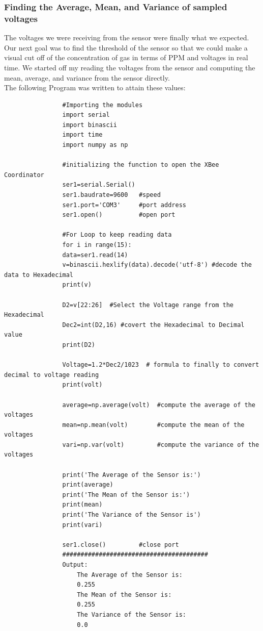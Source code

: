 		\subsubsection{Finding the Average, Mean, and Variance of sampled voltages}
			\par The voltages we were receiving from the sensor were finally what we expected. Our next goal was to find the threshold of the sensor so that we could make a visual cut off of the concentration of gas in terms of PPM and voltages in real time. We started off my reading the voltages from the sensor and computing the mean, average, and variance from the sensor directly.\\
			The following Program was written to attain these values: \\
			\begin{lstlisting}
				#Importing the modules				
				import serial				
				import binascii				
				import time				
				import numpy as np
								
				#initializing the function to open the XBee Coordinator				
				ser1=serial.Serial()				
				ser1.baudrate=9600   #speed				
				ser1.port='COM3'     #port address				
				ser1.open()          #open port
								
				#For Loop to keep reading data			
				for i in range(15):				
				data=ser1.read(14)				
				v=binascii.hexlify(data).decode('utf-8') #decode the data to Hexadecimal				
				print(v)
								
				D2=v[22:26]  #Select the Voltage range from the Hexadecimal				
				Dec2=int(D2,16) #covert the Hexadecimal to Decimal value 			
				print(D2)				
				
				Voltage=1.2*Dec2/1023  # formula to finally to convert decimal to voltage reading												
				print(volt)				
				
				average=np.average(volt)  #compute the average of the voltages				
				mean=np.mean(volt)        #compute the mean of the voltages
				vari=np.var(volt)         #compute the variance of the voltages

				print('The Average of the Sensor is:')
				print(average)
				print('The Mean of the Sensor is:')
				print(mean)
				print('The Variance of the Sensor is')
				print(vari)
				
				ser1.close()         #close port
				########################################
				Output:
					The Average of the Sensor is:
					0.255
					The Mean of the Sensor is:
					0.255
					The Variance of the Sensor is:
					0.0
			\end{lstlisting}
